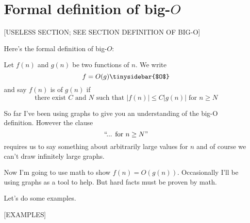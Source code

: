\section{Formal definition of big-$O$}

[USELESS SECTION; SEE SECTION DEFINITION OF BIG-O]

Here's the formal definition of big-$O$:

\begin{defn}
Let $f(n)$ and $g(n)$ be two functions of $n$.
We write
\[ 
f = O(g) \index{$0$}\tinysidebar{$O$}
\]
and say $f(n)$ is  of $g(n)$ if
\[
\text{there exist $C$ and $N$ such that $|f(n)| \leq C|g(n)|$ 
for $n \geq N$}
\]
\end{defn}

So far I've been using graphs to give you an understanding of the 
big-O definition.
However the clause
\[
\text{\lq\lq ... for $n \geq N$''}
\]
requires us to say something about arbitrarily large values for $n$
and of course we can't draw infinitely large graphs.

Now I'm going to use math to show $f(n) = O(g(n))$.
Occasionally I'll be using graphs as a tool to help.
But hard facts must be proven by math.

Let's do some examples.

[EXAMPLES]

